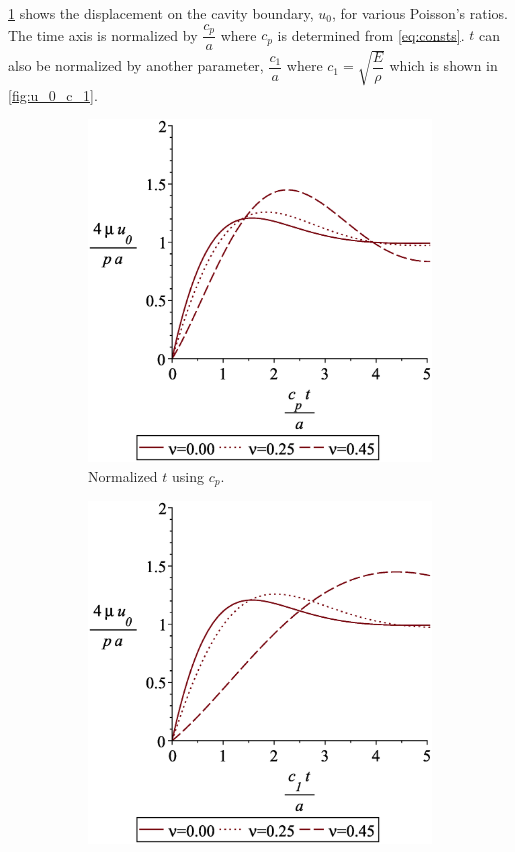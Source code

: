 \documentclass{article}
\begin{document}
\cref{fig:u_0_c_p} shows the displacement on the cavity boundary, $u_0$, for various Poisson's ratios. The time axis is normalized by $\dfrac{c_p}{a}$ where $c_p$ is determined from \cref{eq:consts}. $t$ can also be normalized by another parameter, $\dfrac{c_1}{a}$ where $c_1 = \sqrt{\dfrac{E}{\rho}}$ which is shown in \cref{fig:u_0_c_1}.

\begin{figure}[H]
    \centering
        \begin{subfigure}{0.49\textwidth}
            \includegraphics[width=1\linewidth]{figures/u_0_c_p.eps} 
            \caption{Normalized $t$ using $c_p$.}
            \label{fig:u_0_c_p}
        \end{subfigure}
        \begin{subfigure}{0.49\textwidth}
            \includegraphics[width=1\linewidth]{figures/u_0_c_1.eps} 

\end{subfigure}
\end{figure}
\end{document}
